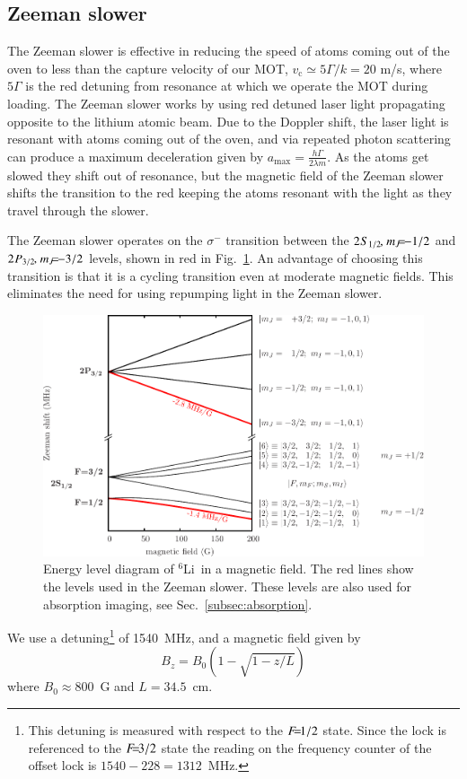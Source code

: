 \documentclass[oneside,12pt]{memoir}
\newcommand{\twos}[1]{\ensuremath{\hspace{-1pt}2\hspace{0.5pt}\hspace{0pt}S_{#1}\hspace{-1pt}}}
\newcommand{\twop}[1]{\ensuremath{\hspace{-1pt}2\hspace{0.5pt}\hspace{0pt}P_{#1}\hspace{-1pt}}}
\newcommand{\cm}{\ensuremath{,\hspace{1pt}}}
\newcommand{\f}[1]{\ensuremath{F\hspace{-5pt}=\hspace{-4pt}#1}}
\newcommand{\mj}[1]{\ensuremath{m_{J}\hspace{-5pt}=\hspace{-4pt}#1}}
\newcommand{\li} {\ensuremath{^{6}}Li\ }
\begin{document}
\subsection{Zeeman slower}
\label{subsec:zeemanslower}
The Zeeman slower is effective in reducing the speed of atoms coming out of the
oven to less than the capture velocity of our MOT, $v_{\mathrm{c}}\simeq
5\Gamma/k = 20$ m/s, where $5\Gamma$ is the red detuning from resonance at
which we operate the MOT during loading. The Zeeman slower works by using red
detuned laser light propagating opposite to the lithium atomic beam.  Due to
the Doppler shift, the laser light is resonant with atoms coming out of the
oven, and via repeated photon scattering can produce a maximum deceleration
given by $a_{\mathrm{max}} = \frac{h\Gamma}{2\lambda m}$.  As the atoms get
slowed they shift out of resonance, but the magnetic field of the Zeeman slower
shifts the transition to the red keeping the atoms resonant with the light as
they travel through the slower.

The Zeeman slower operates on the $\sigma^{-}$  transition between the
$\twos{1/2}\cm\mj{-1/2}$ and $\twop{3/2}\cm\mj{-3/2}$ levels, shown in red in
Fig.~\ref{fig:zeemanlevels}. An advantage of choosing this transition is that
it is a cycling transition even at moderate magnetic fields.  This eliminates
the need for using repumping light in the Zeeman slower.  \begin{figure}
\centering
\includegraphics[width=1.0\textwidth]{../figures/levels/zeeman/01eps.pdf}
\caption[Levels of \li in a magnetic field. ]{\small Energy level diagram of
\li in a magnetic field.   The red lines show the levels used in the Zeeman
slower.  These levels are also used for absorption imaging, see
Sec.~\ref{subsec:absorption}. } \label{fig:zeemanlevels} \end{figure} We use a
detuning\footnote{This detuning is measured with respect to the \f{1/2} state.
Since the lock is referenced to the \f{3/2} state the reading on the frequency
counter of the offset lock is $1540-228=1312$~MHz.} of 1540~MHz, and a magnetic
field given by \[ B_{z} = B_{0}(1-\sqrt{1-z/L}) \] where $B_{0}\approx800$~G
and $L=34.5$~cm.   
\end{document}
